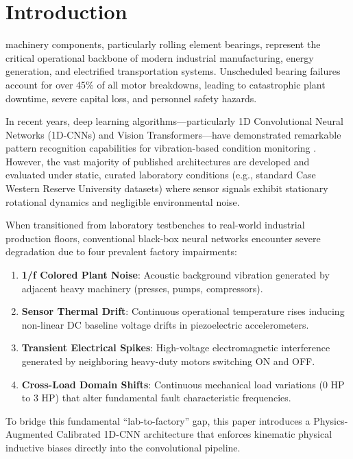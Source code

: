 ﻿\documentclass[journal,10pt,twocolumn]{IEEEtran}
\begin{document}
\section{Introduction}
 machinery components, particularly rolling element bearings, represent the critical operational backbone of modern industrial manufacturing, energy generation, and electrified transportation systems. Unscheduled bearing failures account for over 45\% of all motor breakdowns, leading to catastrophic plant downtime, severe capital loss, and personnel safety hazards.

In recent years, deep learning algorithms---particularly 1D Convolutional Neural Networks (1D-CNNs) and Vision Transformers---have demonstrated remarkable pattern recognition capabilities for vibration-based condition monitoring \cite{zhang2018deep, lei2020applications}. However, the vast majority of published architectures are developed and evaluated under static, curated laboratory conditions (e.g., standard Case Western Reserve University datasets) where sensor signals exhibit stationary rotational dynamics and negligible environmental noise.

When transitioned from laboratory testbenches to real-world industrial production floors, conventional black-box neural networks encounter severe degradation due to four prevalent factory impairments:
\begin{enumerate}
    \item \textbf{1/f Colored Plant Noise}: Acoustic background vibration generated by adjacent heavy machinery (presses, pumps, compressors).
    \item \textbf{Sensor Thermal Drift}: Continuous operational temperature rises inducing non-linear DC baseline voltage drifts in piezoelectric accelerometers.
    \item \textbf{Transient Electrical Spikes}: High-voltage electromagnetic interference generated by neighboring heavy-duty motors switching ON and OFF.
    \item \textbf{Cross-Load Domain Shifts}: Continuous mechanical load variations (0 HP to 3 HP) that alter fundamental fault characteristic frequencies.
\end{enumerate}

To bridge this fundamental ``lab-to-factory'' gap, this paper introduces a Physics-Augmented Calibrated 1D-CNN architecture that enforces kinematic physical inductive biases directly into the convolutional pipeline.
\end{document}
